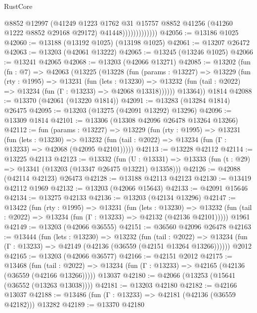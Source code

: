 \begin{lexlean}{RustCore}
\begin{coremodule}
                            @8852
                            @12997
                            (@41249
                              @1223
                              @1762
                              @31
                              @15757
                              @8852
                              @41256
                              (@41260 @1222 @8852 @29168 @29172)
                              @41448)))))))))))))
@42056 := @13186 @1025
@42060 := @13188 (@13192 @1025) (@13198 @1025)
@42061 := @13207 @26472
@42063 := @13203 (@42061 @13222)
@42065 := @13245 (@13246 @1025)
@42066 := @13241 @42065
@42068 := @13203 (@42066 @13271)
@42085 := @13202
    (fun (fn : @7) =>
    @42063
      (@13225
        (@13228
          (fun (params : @13227) =>
          @13229
            (fun (rty : @1995) =>
            @13231
              (fun (lets : @13230) =>
              @13232 (fun (tail : @2022) => @13234 (fun (Γ : @13233) => @42068 @13318))))))
        @13364))
    @1814
@42088 := @13370 (@42061 (@13220 @1814))
@42091 := @13283 (@13284 @1814) @26475
@42095 := @13203 (@13275 (@42091 @13292) @13296)
@42096 := @13309 @1814
@42101 := @13306 (@13308 @42096 @26478 @13264 @13266)
@42112 := fun (params : @13227) =>
  @13229
    (fun (rty : @1995) =>
    @13231
      (fun (lets : @13230) =>
      @13232 (fun (tail : @2022) => @13234 (fun (Γ : @13233) => @42068 (@42095 @42101)))))
@42113 := @13228 @42112
@42114 := @13225 @42113
@42123 := @13332
    (fun (U : @13331) => @13333 (fun (t : @29) => @13341 (@13203 (@13347 @26475 @13221) @13358)))
@42126 := @42088 (@42114 @42123) @26473
@42128 := @13188 @42113 @42123
@42130 := @13419 @42112 @1969
@42132 := @13203 (@42066 @15643)
@42133 := @42091 @15646
@42134 := @13275 @42133
@42136 := @13203 (@42134 @13296)
@42147 := @13422
    (fun (rty : @1995) =>
    @13231
      (fun (lets : @13230) =>
      @13232 (fun (tail : @2022) => @13234 (fun (Γ : @13233) => @42132 (@42136 @42101)))))
    @1961
@42149 := @13203 (@42066 @36555)
@42151 := @36560 @42096 @26478
@42163 := @13444
    (fun (lets : @13230) =>
    @13232
      (fun (tail : @2022) =>
      @13234 (fun (Γ : @13233) => @42149 (@42136 (@36559 (@42151 @13264 @13266))))))
    @2012
@42165 := @13203 (@42066 @36577)
@42166 := @42151 @2012
@42175 := @13468
    (fun (tail : @2022) => @13234 (fun (Γ : @13233) => @42165 (@42136 (@36559 (@42166 @13266)))))
    @13037
@42180 := @42066 (@13253 (@15641 (@36552 (@13263 @13038))))
@42181 := @13203 @42180
@42182 := @42166 @13037
@42188 := @13486 (fun (Γ : @13233) => @42181 (@42136 (@36559 @42182))) @13282
@42189 := @13370 @42180

\end{coremodule}
\end{lexlean}

